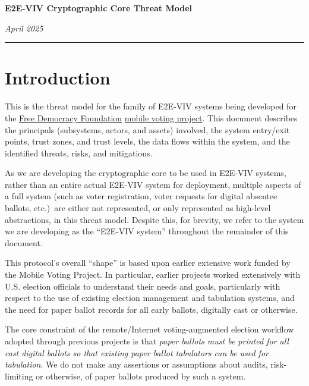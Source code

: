 \documentclass[10pt,letterpaper]{article}
\begin{document}
\begin{center}
{\Large \textbf{E2E-VIV Cryptographic Core Threat Model}}
\end{center}
\vspace{-6pt}

 \hspace{\fill} \textit{April 2025}

\vspace{-12pt}

\rule{\textwidth}{1pt}

\tableofcontents

\section*{Introduction}
\label{sec:intro}

This is the threat model for the family of E2E-VIV systems being developed for the \href{https://freedemocracyfoundation.org/}{Free Democracy Foundation} \href{https://mobilevoting.org/}{mobile voting project}. This document describes the principals (subsystems, actors, and assets) involved, the system entry/exit points, trust zones, and trust levels, the data flows within the system, and the identified threats, risks, and mitigations.

As we are developing the cryptographic core to be used in E2E-VIV systems, rather than an entire actual E2E-VIV system for deployment, multiple aspects of a full system (such as voter registration, voter requests for digital absentee ballots, etc.)~are either not represented, or only represented as high-level abstractions, in this threat model. Despite this, for brevity, we refer to the system we are developing as the ``E2E-VIV system'' throughout the remainder of this document.

This protocol's overall ``shape'' is based upon earlier extensive work funded by the Mobile Voting Project. In particular, earlier projects worked extensively with U.S. election officials to understand their needs and goals, particularly with respect to the use of existing election management and tabulation systems, and the need for paper ballot records for all early ballots, digitally cast or otherwise.

The core constraint of the remote/Internet voting-augmented election workflow adopted through previous projects is that \emph{paper ballots must be printed for all cast digital ballots so that existing paper ballot tabulators can be used for tabulation}. We do not make any assertions or assumptions about audits, risk-limiting or otherwise, of paper ballots produced by such a system.
\end{document}
